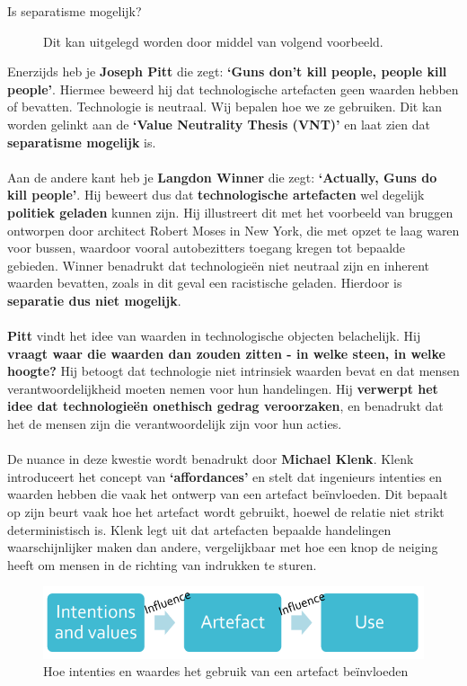 \documentclass[../summary.tex]{subfiles}
\begin{document}
	\begin{description}
		\item[Is separatisme mogelijk?] Dit kan uitgelegd worden door middel van volgend voorbeeld.
	\end{description}
	Enerzijds heb je \textbf{Joseph Pitt} die zegt: \textbf{`Guns don't kill people, people kill people'}. Hiermee beweerd hij dat technologische artefacten geen waarden hebben of bevatten. Technologie is neutraal. Wij bepalen hoe we ze gebruiken. Dit kan worden gelinkt aan de \textbf{`Value Neutrality Thesis (VNT)'} en laat zien dat \textbf{separatisme mogelijk} is.\\
	\\
	Aan de andere kant heb je \textbf{Langdon Winner} die zegt: \textbf{`Actually, Guns do kill people'}. Hij beweert dus dat \textbf{technologische artefacten} wel degelijk \textbf{politiek geladen} kunnen zijn. Hij illustreert dit met het voorbeeld van bruggen ontworpen door architect Robert Moses in New York, die met opzet te laag waren voor bussen, waardoor vooral autobezitters toegang kregen tot bepaalde gebieden. Winner benadrukt dat technologieën niet neutraal zijn en inherent waarden bevatten, zoals in dit geval een racistische geladen. Hierdoor is \textbf{separatie dus niet mogelijk}.\\
	\\
	\textbf{Pitt} vindt het idee van waarden in technologische objecten belachelijk. Hij \textbf{vraagt waar die waarden dan zouden zitten - in welke steen, in welke hoogte?} Hij betoogt dat technologie niet intrinsiek waarden bevat en dat mensen verantwoordelijkheid moeten nemen voor hun handelingen. Hij \textbf{verwerpt het idee dat technologieën onethisch gedrag veroorzaken}, en benadrukt dat het de mensen zijn die verantwoordelijk zijn voor hun acties.\\
	\\
	De nuance in deze kwestie wordt benadrukt door \textbf{Michael Klenk}. Klenk introduceert het concept van \textbf{`affordances'} en stelt dat ingenieurs intenties en waarden hebben die vaak het ontwerp van een artefact beïnvloeden. Dit bepaalt op zijn beurt vaak hoe het artefact wordt gebruikt, hoewel de relatie niet strikt deterministisch is. Klenk legt uit dat artefacten bepaalde handelingen waarschijnlijker maken dan andere, vergelijkbaar met hoe een knop de neiging heeft om mensen in de richting van indrukken te sturen.
	
	\begin{figure}[H]
		\centering
		\includegraphics[width=0.7\linewidth]{../images/affordances}
		\caption{Hoe intenties en waardes het gebruik van een artefact beïnvloeden}
		\label{fig:affordances}
	\end{figure}
	
\end{document}
